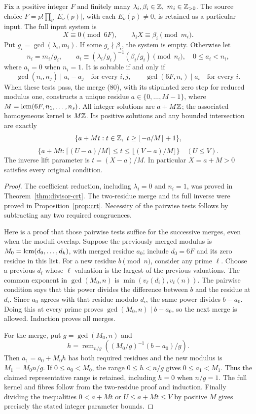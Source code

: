 \begin{proposition}
\label{prop:input-crt}
Fix a positive integer \(F\) and finitely many
\(\lambda_i,\beta_i\in\Z,\ m_i\in\Z_{>0}\).
The source choice \(F=p!\prod_\nu|E_\nu(p)|\), with
each \(E_\nu(p)\ne0\), is retained as a particular input.
The full input system is
\[
 X\equiv0\pmod{6F},\qquad
 \lambda_iX\equiv\beta_i\pmod{m_i}.
\]
Put \(g_i=\gcd(\lambda_i,m_i)\).  If some \(g_i\nmid\beta_i\),
the system is empty.  Otherwise let
\[
 n_i=m_i/g_i,\qquad
 a_i\equiv(\lambda_i/g_i)^{-1}(\beta_i/g_i)\pmod{n_i},
 \quad 0\le a_i<n_i,
\]
where \(a_i=0\) when \(n_i=1\).
It is solvable if and only if
\[
 \gcd(n_i,n_j)\mid a_i-a_j\quad\text{for every }i,j,
 \qquad \gcd(6F,n_i)\mid a_i\quad\text{for every }i.
\]
When these tests pass, the merge (80), with its stipulated
zero step for reduced modulus one, constructs a unique
residue \(a\in\{0,\ldots,M-1\}\), where
\(M=\operatorname{lcm}(6F,n_1,\ldots,n_s)\).  All integer solutions are
\(a+M\mathbb Z\); the associated homogeneous kernel is \(M\mathbb Z\).
Its positive solutions and any bounded intersection are exactly
\[
 \{a+Mt:t\in\Z,\ t\ge\lfloor-a/M\rfloor+1\},
\]
\[
 \{a+Mt:\lceil(U-a)/M\rceil\le t\le
                     \lfloor(V-a)/M\rfloor\}\quad(U\le V).
\]
The inverse lift parameter is \(t=(X-a)/M\).
In particular \(X=a+M>0\) satisfies every original condition.
\end{proposition}
\begin{proof}
The coefficient reduction, including \(\lambda_i=0\) and
\(n_i=1\), was proved in Theorem~\ref{thm:divisor-crt}.
The two-residue merge and its full inverse were proved in
Proposition~\ref{prop:crt}.  Necessity of the pairwise tests
follows by subtracting any two required congruences.

Here is a proof that those pairwise tests suffice for the
successive merges, even when the moduli overlap.
Suppose the previously merged modulus is
\(M_0=\operatorname{lcm}(d_0,\ldots,d_k)\), with merged residue \(a_0\);
include \(d_0=6F\) and its zero residue in this list.
For a new residue \(b\pmod n\), consider any prime \(\ell\).
Choose a previous \(d_i\) whose \(\ell\)-valuation is the
largest of the previous valuations.  The common exponent in
\(\gcd(M_0,n)\) is
\(\min(v_\ell(d_i),v_\ell(n))\).
The pairwise condition says that this power divides the
difference between \(b\) and the residue at \(d_i\).
Since \(a_0\) agrees with that residue modulo \(d_i\),
the same power divides \(b-a_0\).
Doing this at every prime proves
\(\gcd(M_0,n)\mid b-a_0\), so the next merge is allowed.
Induction proves all merges.

For the merge, put \(g=\gcd(M_0,n)\) and
\[
 h=\operatorname{rem}_{n/g}
       \left((M_0/g)^{-1}(b-a_0)/g\right).
\]
Then \(a_1=a_0+M_0h\) has both required residues and
the new modulus is \(M_1=M_0n/g\).
If \(0\le a_0<M_0\), the range \(0\le h<n/g\)
gives \(0\le a_1<M_1\).  Thus the claimed representative
range is retained, including \(h=0\) when \(n/g=1\).
The full kernel and fibres follow from the two-residue
proof and induction.  Finally dividing the inequalities
\(0<a+Mt\) or \(U\le a+Mt\le V\) by positive \(M\)
gives precisely the stated integer parameter bounds.
\end{proof}


